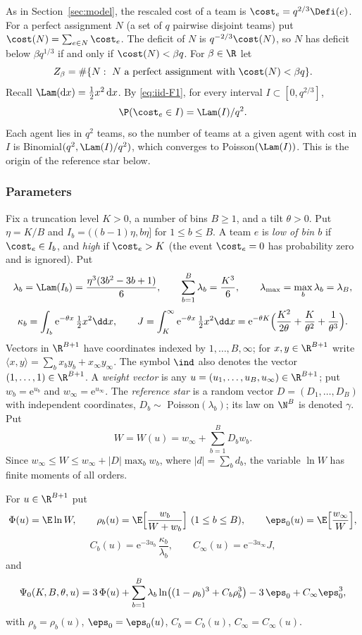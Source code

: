As in Section~\ref{sec:model}, the rescaled cost of a team is $\cost_e=q^{2/3}\Defi(e)$.
For a perfect assignment $N$ (a set of $q$ pairwise disjoint teams) put
$\cost(N)=\sum_{e\in N}\cost_e$. The deficit of $N$ is $q^{-2/3}\cost(N)$, so $N$ has
deficit below $\beta q^{1/3}$ if and only if $\cost(N)<\beta q$. For $\beta\in\R$ let
\[
Z_\beta=\#\{N:\ N\text{ a perfect assignment with }\cost(N)<\beta q\}.
\]
Recall $\Lam(\mathrm{d}x)=\tfrac12x^2\,\mathrm{d}x$. By \eqref{eq:iid-F1}, for every interval
$I\subset[0,q^{2/3}]$,
\begin{equation}\label{eq:iid-binprob}
\P(\cost_e\in I)=\Lam(I)/q^2 .
\end{equation}
Each agent lies in $q^2$ teams, so the number of teams at a given agent with cost in $I$ is
Binomial$(q^2,\Lam(I)/q^2)$, which converges to Poisson$(\Lam(I))$. This is the origin of
the reference star below.

\subsubsection*{Parameters}
Fix a truncation level $K>0$, a number of bins $B\ge1$, and a tilt $\theta>0$. Put
$\eta=K/B$ and $I_b=((b-1)\eta,b\eta]$ for $1\le b\le B$. A team $e$ is \emph{low of bin
$b$} if $\cost_e\in I_b$, and \emph{high} if $\cost_e>K$ (the event $\cost_e=0$ has
probability zero and is ignored). Put
\[
\lambda_b=\Lam(I_b)=\frac{\eta^3(3b^2-3b+1)}{6},\qquad
\sum_{b=1}^B\lambda_b=\frac{K^3}{6},\qquad
\lambda_{\max}=\max_b\lambda_b=\lambda_B,
\]
\[
\kappa_b=\int_{I_b}\mathrm{e}^{-\theta x}\,\tfrac12x^2\dd x,\qquad
J=\int_K^\infty \mathrm{e}^{-\theta x}\,\tfrac12x^2\dd x
 =\mathrm{e}^{-\theta K}\Bigl(\frac{K^2}{2\theta}+\frac{K}{\theta^2}+\frac1{\theta^3}\Bigr).
\]
Vectors in $\R^{B+1}$ have coordinates indexed by $1,\dots,B,\infty$; for $x,y\in\R^{B+1}$
write $\langle x,y\rangle=\sum_{b}x_by_b+x_\infty y_\infty$. The symbol $\ind$ also denotes
the vector $(1,\dots,1)\in\R^{B+1}$. A \emph{weight vector} is any
$u=(u_1,\dots,u_B,u_\infty)\in\R^{B+1}$; put $w_b=\mathrm{e}^{u_b}$ and
$w_\infty=\mathrm{e}^{u_\infty}$. The \emph{reference star} is a random vector
$D=(D_1,\dots,D_B)$ with independent coordinates, $D_b\sim$ Poisson$(\lambda_b)$; its law
on $\N^B$ is denoted $\gamma$. Put
\[
W=W(u)=w_\infty+\sum_{b=1}^BD_bw_b .
\]
Since $w_\infty\le W\le w_\infty+|D|\max_bw_b$, where $|d|=\sum_bd_b$, the variable $\ln W$
has finite moments of all orders.

\begin{definition}\label{def:iid-psi0}
For $u\in\R^{B+1}$ put
\[
\Phi(u)=\E\ln W,\qquad
\rho_b(u)=\E\Bigl[\frac{w_b}{W+w_b}\Bigr]\ (1\le b\le B),\qquad
\eps_0(u)=\E\Bigl[\frac{w_\infty}{W}\Bigr],
\]
\[
C_b(u)=\mathrm{e}^{-3u_b}\,\frac{\kappa_b}{\lambda_b},\qquad
C_\infty(u)=\mathrm{e}^{-3u_\infty}J,
\]
and
\begin{equation}\label{eq:iid-psi0}
\Psi_0(K,B,\theta,u)=3\,\Phi(u)+\sum_{b=1}^B\lambda_b\ln\bigl((1-\rho_b)^3+C_b\rho_b^3\bigr)
 -3\,\eps_0+C_\infty\eps_0^3 ,
\end{equation}
with $\rho_b=\rho_b(u)$, $\eps_0=\eps_0(u)$, $C_b=C_b(u)$, $C_\infty=C_\infty(u)$.
\end{definition}

